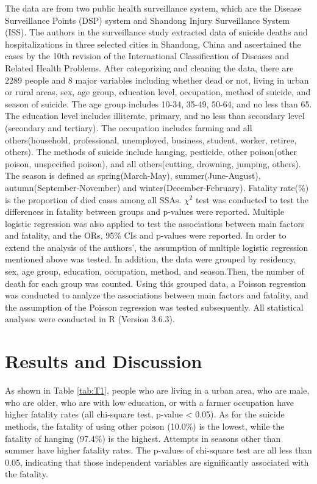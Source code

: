 \documentclass[a4paper]{article}
\begin{document}
The data are from two public health surveillance system, which are the Disease Surveillance Points (DSP) system and Shandong Injury Surveillance System (ISS). The authors in the surveillance study \citep{Sun2015} extracted data of suicide deaths and hospitalizations in three selected cities in Shandong, China and ascertained the cases by the 10th revision of the International Classification of Diseases and Related Health Problems.
\newline
\newline
After categorizing and cleaning the data, there are 2289 people and 8 major variables including whether dead or not, living in urban or rural areas, sex, age group, education level, occupation, method of suicide, and season of suicide. The age group includes 10-34, 35-49, 50-64, and no less than 65. The education level includes illiterate, primary, and no less than secondary level (secondary and tertiary). The occupation includes farming and all others(household, professional, unemployed, business, student, worker, retiree, others). The methods of suicide include hanging, pesticide, other poison(other poison, unspecified poison), and all others(cutting, drowning, jumping, others). The season is defined as spring(March-May), summer(June-August), autumn(September-November) and winter(December-February).
\newline
\newline
Fatality rate(\%) is the proportion of died cases among all SSAs. $\chi^2$ test was conducted to test the differences in fatality between groups and p-values were reported. Multiple logistic regression was also applied to test the associations between main factors and fatality, and the ORs, 95\% CIs and p-values were reported. In order to extend the analysis of the authors', the assumption of multiple logistic regression mentioned above was tested. In addition, the data were grouped by residency, sex, age group, education, occupation, method, and season.Then, the number of death for each group was counted. Using this grouped data, a Poisson regression was conducted to analyze the associations between main factors and fatality, and the assumption of the Poisson regression was tested subsequently. All statistical analyses were conducted in R (Version 3.6.3).

\section*{Results and Discussion}

As shown in Table \ref{tab:T1}, people who are living in a urban area, who are male, who are older, who are with low education, or with a farmer occupation have higher fatality rates (all chi-square test, p-value < 0.05). As for the suicide methods, the fatality of using other poison (10.0\%) is the lowest, while the fatality of hanging (97.4\%) is the highest. Attempts in seasons other than summer have higher fatality rates. The p-values of chi-square test are all less than 0.05, indicating that those independent variables are significantly associated with the fatality.
\newpage

\end{document}

